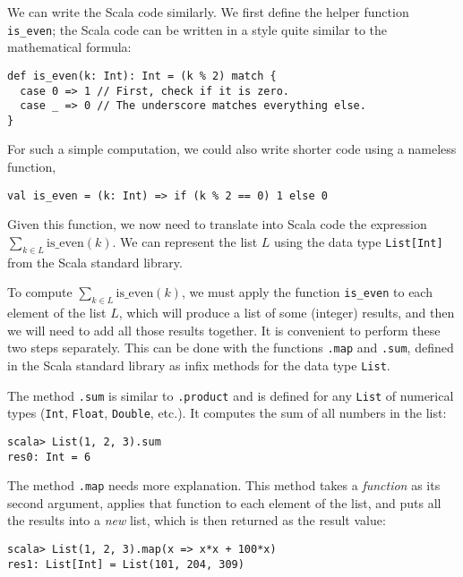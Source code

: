 We can write the Scala code similarly. We first define the helper
function \lstinline!is_even!; the Scala code can be written in a
style quite similar to the mathematical formula:

\begin{lstlisting}
def is_even(k: Int): Int = (k % 2) match {
  case 0 => 1 // First, check if it is zero.
  case _ => 0 // The underscore matches everything else.
}
\end{lstlisting}

For such a simple computation, we could also write shorter code using
a nameless function,

\begin{lstlisting}
val is_even = (k: Int) => if (k % 2 == 0) 1 else 0
\end{lstlisting}

Given this function, we now need to translate into Scala code the
expression $\sum_{k\in L}\text{is\_even}\left(k\right)$. We can represent
the list $L$ using the data type \lstinline!List[Int]! from the
Scala standard library.

To compute $\sum_{k\in L}\text{is\_even}\left(k\right)$, we must
apply the function \texttt{}\lstinline!is_even! to each element
of the list $L$, which will produce a list of some (integer) results,
and then we will need to add all those results together. It is convenient
to perform these two steps separately. This can be done with the functions
\texttt{}\lstinline!.map! and \lstinline!.sum!, defined in the
Scala standard library as infix methods for the data type \lstinline!List!.

The method \texttt{}\lstinline!.sum! is similar to \lstinline!.product!
and is defined for any \lstinline!List! of numerical types (\lstinline!Int!,
\lstinline!Float!, \lstinline!Double!, etc.). It computes the sum
of all numbers in the list:
\begin{lstlisting}
scala> List(1, 2, 3).sum
res0: Int = 6
\end{lstlisting}

The method \texttt{}\lstinline!.map! needs more explanation. This
method takes a \emph{function} as its second argument, applies that
function to each element of the list, and puts all the results into
a \emph{new }list, which is then returned as the result value:

\begin{lstlisting}
scala> List(1, 2, 3).map(x => x*x + 100*x)
res1: List[Int] = List(101, 204, 309)
\end{lstlisting}

